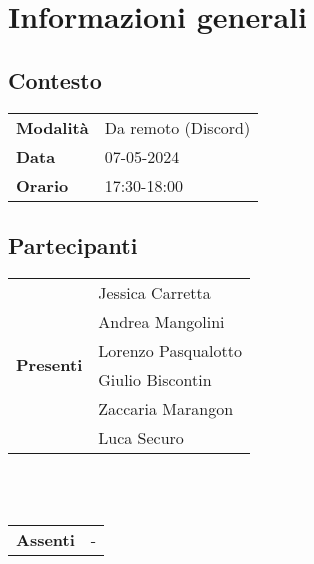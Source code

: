 \section{Informazioni generali}
    \subsection{Contesto}
        \begin{tabular}{ p{2.2cm} | l }
            \textbf{Modalità} & Da remoto (Discord)\\  %
            \textbf{Data} & 07-05-2024\\    %
            \textbf{Orario} & 17:30-18:00   %
        \end{tabular}

        \subsection{Partecipanti}

        \begin{tabular}{ p{2.2cm} | l }   %
            \multirow{6}{*}{\textbf{Presenti}} 
                & Jessica Carretta \\
                & Andrea Mangolini \\
                & Lorenzo Pasqualotto \\
                & Giulio Biscontin \\
                & Zaccaria Marangon \\
                & Luca Securo
        \end{tabular} 
        \\
        \vspace*{0.2cm}
        \\
        \begin{tabular}{ p{2.2cm} | l }   %
            \multirow{1}{*}{\textbf{Assenti}} & -
        \end{tabular} 
        \\
        \\